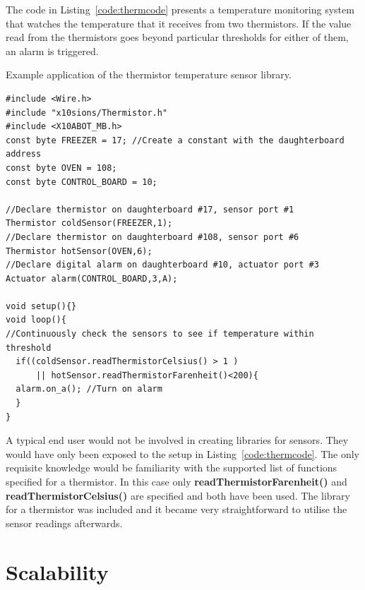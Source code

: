 The code in Listing~\ref{code:thermcode} presents a temperature monitoring system that watches the temperature that it receives from two thermistors. If the value read from the thermistors goes beyond particular thresholds for either of them, an alarm is triggered.
\begin{listing}
		\footnotesize
		\caption{Example application of the thermistor temperature sensor library.} \label{code:thermcode}
		\begin{verbatim}
#include <Wire.h>  
#include "x10sions/Thermistor.h"
#include <X10ABOT_MB.h>
const byte FREEZER = 17; //Create a constant with the daughterboard address
const byte OVEN = 108;
const byte CONTROL_BOARD = 10;

//Declare thermistor on daughterboard #17, sensor port #1
Thermistor coldSensor(FREEZER,1);
//Declare thermistor on daughterboard #108, sensor port #6
Thermistor hotSensor(OVEN,6);
//Declare digital alarm on daughterboard #10, actuator port #3
Actuator alarm(CONTROL_BOARD,3,A);

void setup(){}
void loop(){
//Continuously check the sensors to see if temperature within threshold
  if((coldSensor.readThermistorCelsius() > 1 )
      || hotSensor.readThermistorFarenheit()<200){
  alarm.on_a(); //Turn on alarm 
  }
}
	\end{verbatim}
		
\end{listing}

A typical end user would not be involved in creating libraries for sensors. They would have only been exposed to the setup in Listing~\ref{code:thermcode}. The only requisite knowledge would be familiarity with the supported list of functions specified for a thermistor. In this case only \textbf{readThermistorFarenheit()} and  \textbf{readThermistorCelsius()} are specified and both have been used.
The library for a thermistor was included and it became very straightforward to utilise the sensor readings afterwards.

\section{Scalability} %
\label{sec:scalability}

